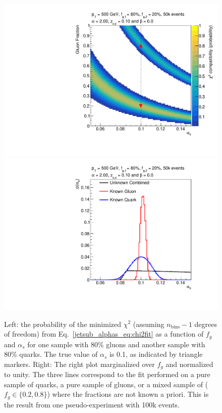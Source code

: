 \documentclass[11pt]{cernrep}
\begin{document}
	
\begin{figure}[t]
\begin{center}
\includegraphics[width = 0.49\columnwidth]{jetsub_alphas_banana_alpha_20beta_0_zcut_123451324.pdf}
\includegraphics[width = 0.49\columnwidth]{jetsub_alphas_palpha_alpha_20beta_0_zcut_123451324.pdf}
\end{center}
\caption{Left: the probability of the minimized $\chi^2$ (assuming $n_\mathrm{bins}-1$ degrees of freedom) from Eq.~\ref{jetsub_alphas_eq:chi2fit} as a
  function of $f_g$ and $\alpha_s$ for one sample with 80\% gluons and another sample with 80\% quarks.  The true value of $\alpha_s$ is 0.1, as indicated by triangle markers.  Right: The right plot marginalized over $f_g$ and normalized to unity.  The three lines correspond to the fit performed on a pure sample of quarks, a pure sample of gluons, or a mixed sample of ($f_g\in\{0.2,0.8\}$) where the fractions are not known a priori.  This is the result from one pseudo-experiment with 100k events.}
\label{jetsub_alphas_fig:alpha2fit}
\end{figure}
\end{document}

